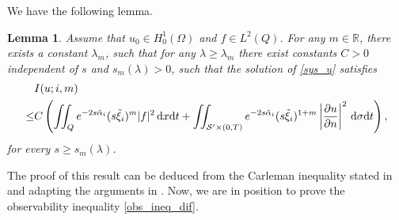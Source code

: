 \documentclass{dcds-bOF}
\newtheorem{lemma}[theorem]{Lemma}
\theoremstyle{definition}
\def\dx{\,\textnormal{d}x}
\def\dt{\textnormal{d}t}
\def\d{\,\textnormal{d}}
\begin{document}
We have the following lemma.
%
\begin{lemma}\label{lemma_car_boundary}
Assume that $u_0\in H_0^1(\Omega)$ and $f\in L^2(Q)$. For any $m\in \mathbb R$, there exists a constant $\lambda_m$, such that for any $\lambda\geq \lambda_m$ there exist constants $C>0$ independent of $s$ and $s_m(\lambda)>0$, such that the solution of \eqref{sys_u} satisfies
%
\begin{align}\label{Est1}
&I(u;i,m)\nonumber\\ \leq &C\left(\iint_{Q}e^{-2s\tilde{\alpha}_i}(s\tilde{\xi}_i)^m|f|^2\dx\dt+\iint_{\mathcal S^\prime\times(0,T)}e^{-2s\tilde{\alpha}_i}(s\tilde{\xi}_i)^{1+m}\left|\frac{\partial u}{\partial n}\right|^2\d\sigma\dt\right),
\end{align}
%
for every $s\geq s_m(\lambda)$.
\end{lemma}
%
The proof of this result can be deduced from the Carleman inequality stated in \cite[Lemma 1.1]{ima_original} and adapting the arguments in \cite[Lemma 2.3]{ima_yama}. Now, we are in position to prove the observability inequality \eqref{obs_ineq_dif}.
\end{document}
